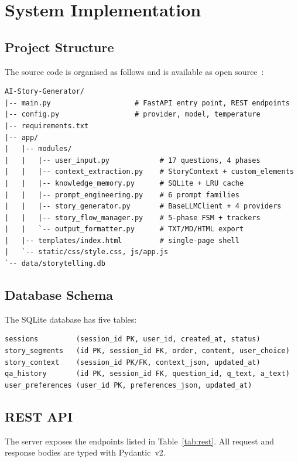 \section{System Implementation}

\subsection{Project Structure}

The source code is organised as follows and is available as open source~\citep{jha2026repo}:

\begin{lstlisting}
AI-Story-Generator/
|-- main.py                    # FastAPI entry point, REST endpoints
|-- config.py                  # provider, model, temperature
|-- requirements.txt
|-- app/
|   |-- modules/
|   |   |-- user_input.py            # 17 questions, 4 phases
|   |   |-- context_extraction.py    # StoryContext + custom_elements
|   |   |-- knowledge_memory.py      # SQLite + LRU cache
|   |   |-- prompt_engineering.py    # 6 prompt families
|   |   |-- story_generator.py       # BaseLLMClient + 4 providers
|   |   |-- story_flow_manager.py    # 5-phase FSM + trackers
|   |   `-- output_formatter.py      # TXT/MD/HTML export
|   |-- templates/index.html         # single-page shell
|   `-- static/css/style.css, js/app.js
`-- data/storytelling.db
\end{lstlisting}

\subsection{Database Schema}

The SQLite database has five tables:

\begin{lstlisting}
sessions         (session_id PK, user_id, created_at, status)
story_segments   (id PK, session_id FK, order, content, user_choice)
story_context    (session_id PK/FK, context_json, updated_at)
qa_history       (id PK, session_id FK, question_id, q_text, a_text)
user_preferences (user_id PK, preferences_json, updated_at)
\end{lstlisting}

\subsection{REST API}

The server exposes the endpoints listed in Table~\ref{tab:rest}. All request and response bodies are typed with Pydantic~v2.


